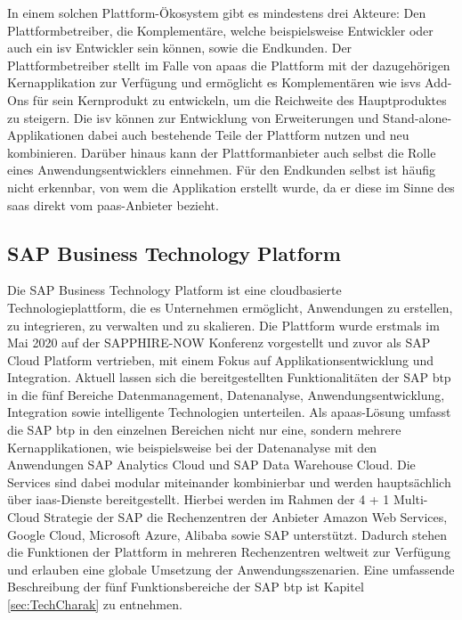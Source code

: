 
In einem solchen Plattform-Ökosystem gibt es mindestens drei Akteure: Den Plattformbetreiber, die Komplementäre, welche beispielsweise Entwickler oder auch ein \ac{isv} Entwickler sein können, sowie die Endkunden. Der Plattformbetreiber stellt im Falle von \ac{apaas} die Plattform mit der dazugehörigen Kernapplikation zur Verfügung und ermöglicht es Komplementären wie \ac{isv}s Add-Ons für sein Kernprodukt zu entwickeln, um die Reichweite des Hauptproduktes zu steigern. Die \ac{isv} können zur Entwicklung von Erweiterungen und Stand-alone-Applikationen dabei auch bestehende Teile der Plattform nutzen und neu kombinieren. Darüber hinaus kann der Plattformanbieter auch selbst die Rolle eines Anwendungsentwicklers einnehmen.\autocite[Vgl.][S. 444f]{FOERDERER2018} Für den Endkunden selbst ist häufig nicht erkennbar, von wem die Applikation erstellt wurde, da er diese im Sinne des \ac{saas} direkt vom \ac{paas}-Anbieter bezieht. \autocite[Vgl.][S. 372]{BEIMBORN2011}

\subsection{SAP Business Technology Platform}

Die SAP Business Technology Platform ist eine cloudbasierte Technologieplattform, die es Unternehmen ermöglicht, Anwendungen zu erstellen, zu integrieren, zu verwalten und zu skalieren. Die Plattform wurde erstmals im Mai 2020 auf der SAPPHIRE-NOW Konferenz vorgestellt und zuvor als SAP Cloud Platform vertrieben, mit einem Fokus auf Applikationsentwicklung und Integration.\autocite[Vgl.][S. 2]{PREUSS2021}  Aktuell lassen sich die bereitgestellten Funktionalitäten der SAP \ac{btp} in die fünf Bereiche Datenmanagement, Datenanalyse, Anwendungsentwicklung, Integration sowie intelligente Technologien unterteilen. Als \ac{apaas}-Lösung umfasst die SAP \ac{btp} in den einzelnen Bereichen nicht nur eine, sondern mehrere Kernapplikationen, wie beispielsweise bei der Datenanalyse mit den Anwendungen SAP Analytics Cloud und SAP Data Warehouse Cloud. Die Services sind dabei modular miteinander kombinierbar und werden hauptsächlich über \ac{iaas}-Dienste bereitgestellt. Hierbei werden im Rahmen der 4 + 1 Multi-Cloud Strategie der SAP die Rechenzentren der Anbieter Amazon Web Services, Google Cloud, Microsoft Azure, Alibaba sowie SAP unterstützt. Dadurch stehen die Funktionen der Plattform in mehreren Rechenzentren weltweit zur Verfügung und erlauben eine globale Umsetzung der Anwendungsszenarien.\autocite[Vgl.][S. 57-59]{SEUBERT} Eine umfassende Beschreibung der fünf Funktionsbereiche der SAP \ac{btp} ist Kapitel \ref{sec:TechCharak} zu entnehmen.


